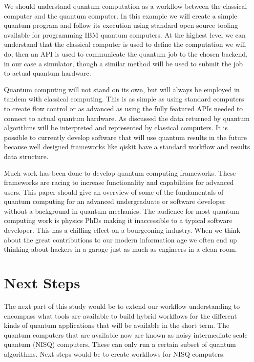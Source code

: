 \documentclass{article}
\begin{document}
We should understand quantum computation as a workflow between the classical computer and the quantum computer. In this example we will create a simple quantum program and follow its execution using standard open source tooling available for programming IBM quantum computers. At the highest level we can understand that the classical computer is used to define the computation we will do, then an API is used to communicate the quantum job to the chosen backend, in our case a simulator, though a similar method will be used to submit the job to actual quantum hardware.

Quantum computing will not stand on its own, but will always be employed in tandem with classical computing. This is as simple as using standard computers to create flow control or as advanced as using the fully featured APIs needed to connect to actual quantum hardware. As discussed the data returned by quantum algorithms will be interpreted and represented by classical computers. It is possible to currently develop software that will use quantum results in the future because well designed frameworks like qiskit have a standard workflow and results data structure. 

Much work has been done to develop quantum computing frameworks. These frameworks are racing to increase functionality and capabilities for advanced users. This paper should give an overview of some of the fundamentals of quantum computing for an advanced undergraduate or software developer without a background in quantum mechanics. The audience for most quantum computing work is physics PhDs making it inaccessible to a typical software developer. This has a chilling effect on a bourgeoning industry. When we think about the great contributions to our modern information age we often end up thinking about hackers in a garage just as much as engineers in a clean room.

\section{Next Steps}

The next part of this study would be to extend our workflow understanding to encompass what tools are available to build hybrid workflows for the different kinds of quantum applications that will be available in the short term. The quantum computers that are available now are known as noisy intermediate scale quantum (NISQ) computers. These can only run a certain subset of quantum algorithms. Next steps would be to create workflows for NISQ computers. 
\end{document}
